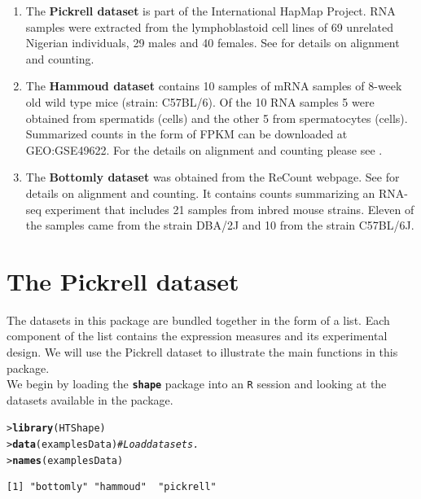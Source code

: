 \documentclass[a4paper, 10pt]{article}\usepackage[]{graphicx}\usepackage[]{color}
\makeatletter
\newcommand{\hlcom}[1]{\textcolor[rgb]{0.678,0.584,0.686}{\textit{#1}}}%
\newcommand{\hlstd}[1]{\textcolor[rgb]{0.345,0.345,0.345}{#1}}%
\newcommand{\hlkwd}[1]{\textcolor[rgb]{0.737,0.353,0.396}{\textbf{#1}}}%
\newenvironment{kframe}{%
 \def\at@end@of@kframe{}%
 \ifinner\ifhmode%
  \def\at@end@of@kframe{\end{minipage}}%
  \begin{minipage}{\columnwidth}%
 \fi\fi%
 \def\FrameCommand##1{\hskip\@totalleftmargin \hskip-\fboxsep
 \colorbox{shadecolor}{##1}\hskip-\fboxsep
     \hskip-\linewidth \hskip-\@totalleftmargin \hskip\columnwidth}%
 \MakeFramed {\advance\hsize-\width
   \@totalleftmargin\z@ \linewidth\hsize
   \@setminipage}}%
 {\par\unskip\endMakeFramed%
 \at@end@of@kframe}
\newenvironment{knitrout}{}{} %
\makeatother
\begin{document}
\begin{enumerate}
\item The \textbf{Pickrell dataset}  
      \cite{Pickrell2010}
      is part of the International 
      HapMap Project. 
      RNA samples were extracted from
      the lymphoblastoid cell lines of 69 
      unrelated Nigerian 
      individuals, 29 males and 40 females. 
      See \cite{Frazee2011} for details on alignment 
      and counting. 
\item The \textbf{Hammoud dataset} \cite{Hammoud2014}
      contains 10 samples of mRNA samples of 8-week 
      old wild type mice (strain: C57BL/6). 
      Of the 10 RNA samples 5 were obtained from
      spermatids (cells) and the other 5
      from spermatocytes (cells).
      Summarized counts in the form 
      of FPKM can be downloaded at 
      GEO:GSE49622.
      For the details on alignment and counting
      please see \cite{Hammoud2014}. 
\item The \textbf{Bottomly dataset} \cite{Bottomly2011}
      was obtained from the ReCount webpage. 
      See \cite{Frazee2011} for details on alignment 
      and counting.
      It contains counts summarizing an RNA-seq 
      experiment that includes 21 samples from
      inbred mouse strains.
      Eleven of the samples came from the strain DBA/2J
      and 10 from the strain C57BL/6J. 
\end{enumerate}

\newpage

\section{The Pickrell dataset}

The datasets in this package are bundled together 
in the form of a list. 
Each component of the list contains the 
expression measures and its experimental design.
We will use the Pickrell dataset to illustrate
the main functions in this package.\\

\noindent We begin by loading the \textbf{\texttt{shape}} 
package into an \texttt{R} session and looking at the
datasets available in the package.

\begin{knitrout}\small
{}\color{fgcolor}\begin{kframe}
\begin{alltt}
\hlstd{> }\hlkwd{library}\hlstd{(HTShape)}
\hlstd{> }\hlkwd{data}\hlstd{(examplesData)} \hlcom{# Load datasets.}
\hlstd{> }\hlkwd{names}\hlstd{(examplesData)}
\end{alltt}
\begin{verbatim}
[1] "bottomly" "hammoud"  "pickrell"
\end{verbatim}
\end{kframe}
\end{knitrout}
\end{document}
